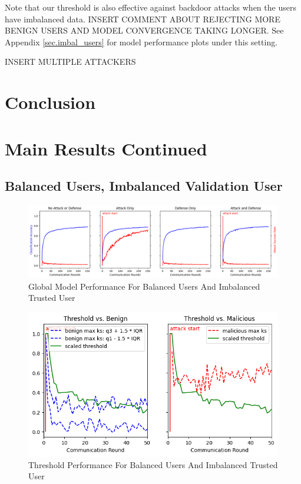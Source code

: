 \documentclass{article} %
\begin{document}
Note that our threshold is also effective against backdoor attacks when the users have imbalanced data. INSERT COMMENT ABOUT REJECTING MORE BENIGN USERS AND MODEL CONVERGENCE TAKING LONGER. See Appendix \ref{sec.imbal_users} for model performance plots under this setting.

INSERT MULTIPLE ATTACKERS

% 
\section{Conclusion}

%



%
\appendix

%
\section{Main Results Continued}

%
\subsection{Balanced Users, Imbalanced Validation User}
\label{sec.imbal_val}

\begin{figure}[H]
    \centering
    \includegraphics[width=\textwidth]{centralized/alpha10000--alpha_val1/visuals/accuracy--n_malicious1--m_start1.png}
    \caption{Global Model Performance For Balanced Users And Imbalanced Trusted User}
    \label{fig:centralized--alpha10000--alpha_val1--accuracy--n_malicious1--m_start1}
\end{figure}

\begin{figure}[H]
    \centering
    \includegraphics[width=.75\textwidth]{centralized/alpha10000--alpha_val1/visuals/threshold--n_malicious1--m_start1--d_rounds50.png}
    \caption{Threshold Performance For Balanced Users And Imbalanced Trusted User}
    \label{fig:centralized--alpha10000--alpha_val1--threshold--n_malicious1--m_start1--d_rounds50}
\end{figure}
\end{document}
